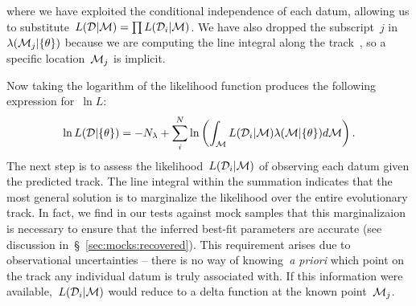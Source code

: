 \documentclass[ms.tex]{subfiles}
\begin{document}
where we have exploited the conditional independence of each datum, allowing us
to substitute~$L(\mathcal{D} | \mathcal{M}) = \prod L(\mathcal{D}_i |
\mathcal{M})$.
We have also dropped the subscript~$j$ in~$\lambda(\mathcal{M}_j | \{\theta\})$
because we are computing the line integral along the track~, so a
specific location~$\mathcal{M}_j$ is implicit.
\par
Now taking the logarithm of the likelihood function produces the following
expression for~$\ln L$:
\begin{equation}
\ln L(\mathcal{D} | \{\theta\}) = -N_\lambda + \sum_i^N \ln \left(
\int_{\mathcal{M}} L(\mathcal{D}_i | \mathcal{M})\lambda(\mathcal{M} | \{\theta\})
d\mathcal{M}
\right).
\label{eq:lnL_with_integral}
\end{equation}
The next step is to assess the likelihood~$L(\mathcal{D}_i | \mathcal{M})$ of
observing each datum given the predicted track.
The line integral within the summation indicates that the most general solution
is to marginalize the likelihood over the entire evolutionary track.
In fact, we find in our tests against mock samples that this marginalizaion is necessary to
ensure that the inferred best-fit parameters are accurate (see discussion
in~\S~\ref{sec:mocks:recovered}).
This requirement arises due to observational uncertainties -- there is no way
of knowing~\textit{a priori} which point on the track any individual datum is
truly associated with.
If this information were available,~$L(\mathcal{D}_i | \mathcal{M})$ would reduce
to a delta function at the known point~$\mathcal{M}_j$.
\end{document}
